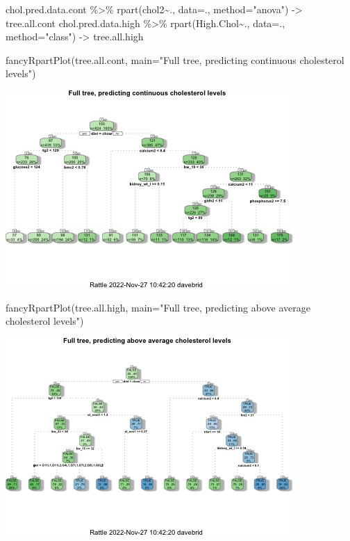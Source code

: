 \documentclass[
]{article}
\newenvironment{Shaded}{\begin{snugshade}}{\end{snugshade}}
\newcommand{\AttributeTok}[1]{\textcolor[rgb]{0.77,0.63,0.00}{#1}}
\newcommand{\FunctionTok}[1]{\textcolor[rgb]{0.00,0.00,0.00}{#1}}
\newcommand{\NormalTok}[1]{#1}
\newcommand{\OtherTok}[1]{\textcolor[rgb]{0.56,0.35,0.01}{#1}}
\newcommand{\SpecialCharTok}[1]{\textcolor[rgb]{0.00,0.00,0.00}{#1}}
\newcommand{\StringTok}[1]{\textcolor[rgb]{0.31,0.60,0.02}{#1}}
\begin{document}
\begin{Shaded}
\begin{Highlighting}[]
\NormalTok{chol.pred.data.cont }\SpecialCharTok{\%\textgreater{}\%} \FunctionTok{rpart}\NormalTok{(chol2}\SpecialCharTok{\textasciitilde{}}\NormalTok{., }\AttributeTok{data=}\NormalTok{., }\AttributeTok{method=}\StringTok{"anova"}\NormalTok{) }\OtherTok{{-}\textgreater{}}\NormalTok{ tree.all.cont}
\NormalTok{chol.pred.data.high }\SpecialCharTok{\%\textgreater{}\%} \FunctionTok{rpart}\NormalTok{(High.Chol}\SpecialCharTok{\textasciitilde{}}\NormalTok{., }\AttributeTok{data=}\NormalTok{., }\AttributeTok{method=}\StringTok{"class"}\NormalTok{) }\OtherTok{{-}\textgreater{}}\NormalTok{ tree.all.high}

\FunctionTok{fancyRpartPlot}\NormalTok{(tree.all.cont, }\AttributeTok{main=}\StringTok{"Full tree, predicting continuous cholesterol levels"}\NormalTok{)}
\end{Highlighting}
\end{Shaded}

\includegraphics{figures/full-tree-1.png}

\begin{Shaded}
\begin{Highlighting}[]
\FunctionTok{fancyRpartPlot}\NormalTok{(tree.all.high, }\AttributeTok{main=}\StringTok{"Full tree, predicting above average cholesterol levels"}\NormalTok{)}
\end{Highlighting}
\end{Shaded}

\includegraphics{figures/full-tree-2.png}
\end{document}
